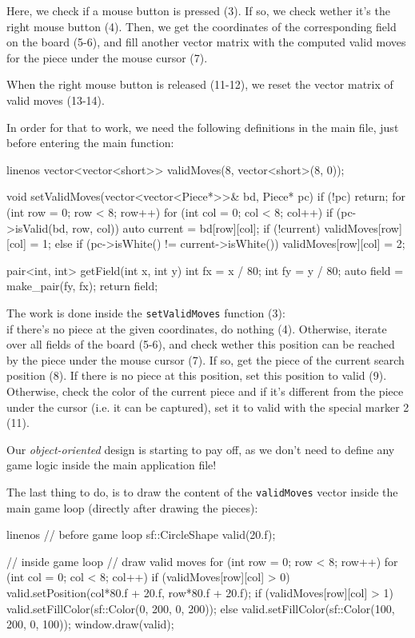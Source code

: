 Here, we check if a mouse button is pressed (3).
If so, we check wether it's the right mouse button (4).
Then, we get the coordinates of the corresponding field on the board (5-6), and
fill another vector matrix with the computed valid moves for the piece under the
mouse cursor (7).

When the right mouse button is released (11-12), we reset the vector matrix of
valid moves (13-14).

In order for that to work, we need the following definitions in the main file,
just before entering the main function:

\begin{cpp*}{linenos}
vector<vector<short>> validMoves(8, vector<short>(8, 0));

void setValidMoves(vector<vector<Piece*>>& bd, Piece* pc) {
  if (!pc) return;
  for (int row = 0; row < 8; row++) {
    for (int col = 0; col < 8; col++) {
      if (pc->isValid(bd, row, col)) {
        auto current = bd[row][col];
        if (!current) validMoves[row][col] = 1; 
        else if (pc->isWhite() != current->isWhite())
          validMoves[row][col] = 2;
      }
    }
  }
}

pair<int, int> getField(int x, int y) {
  int fx = x / 80;
  int fy = y / 80;
  auto field = make_pair(fy, fx);
  return field;
}

\end{cpp*}

The work is done inside the \texttt{setValidMoves} function (3):\\
if there's no piece at the given coordinates, do nothing (4).
Otherwise, iterate over all fields of the board (5-6), and check wether this position can be
reached by the piece under the mouse cursor (7).
If so, get the piece of the current search position (8).
If there is no piece at this position, set this position to valid (9).
Otherwise, check the color of the current piece and if it's different from the piece
under the cursor (i.e. it can be captured), set it to valid with the special marker 2 (11).

Our \emph{object-oriented} design is starting to pay off, as we don't need to define any
game logic inside the main application file!

The last thing to do, is to draw the content of the \texttt{validMoves}
vector inside the main game loop (directly after drawing the pieces):

\begin{cpp*}{linenos}
  // before game loop
  sf::CircleShape valid(20.f);

    // inside game loop
    // draw valid moves
    for (int row = 0; row < 8; row++) {
      for (int col = 0; col < 8; col++) {
        if (validMoves[row][col] > 0) {
          valid.setPosition(col*80.f + 20.f, row*80.f + 20.f);
          if (validMoves[row][col] > 1)
            valid.setFillColor(sf::Color(0, 200, 0, 200));
          else valid.setFillColor(sf::Color(100, 200, 0, 100));
          window.draw(valid);
        }
      }
    }
\end{cpp*}

